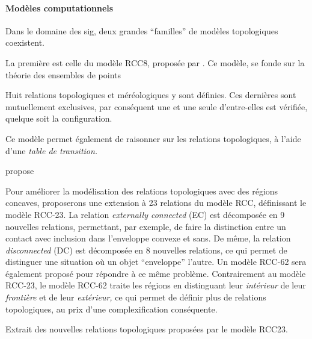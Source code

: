 \paragraph{Modèles computationnels}

Dans le domaine des \ac{sig}, deux grandes \enquote{familles} de
modèles topologiques coexistent.

La première est celle du modèle RCC8, proposée par
\textcite{Randell1992}. Ce modèle, se fonde sur la théorie des
ensembles de points

Huit relations topologiques et méréologiques y sont définies. Ces
dernières sont mutuellement exclusives, par conséquent une et une
seule d'entre-elles est vérifiée, quelque soit la configuration.

Ce modèle permet également de raisonner sur les relations
topologiques, à l'aide d'une \emph{table de transition.}


\textcite{Bennett1994} propose

Pour améliorer la modélisation des relations topologiques avec des
régions concaves, \textcite{Cohn1997} proposerons une extension à 23
relations du modèle RCC, définissant le modèle RCC-23. La relation
\emph{externally connected} (EC) est décomposée en 9 nouvelles
relations, permettant, par exemple, de faire la distinction entre un
contact avec inclusion dans l'enveloppe convexe et sans. De même, la
relation \emph{disconnected} (DC) est décomposée en 8 nouvelles
relations, ce qui permet de distinguer une situation où un objet
\enquote{enveloppe} l'autre. Un modèle RCC-62 sera également proposé
pour répondre à ce même problème. Contrairement au modèle RCC-23, le
modèle RCC-62 traite les régions en distinguant leur \emph{intérieur}
de leur \emph{frontière} et de leur \emph{extérieur,} ce qui permet de
définir plus de relations topologiques, au prix d'une complexification
conséquente.

\begin{table} \centering 
  \caption{Extrait des nouvelles relations topologiques proposées par
le modèle RCC23.}
  \label{tab:RCC8_vs_RCC23}
\end{table}


